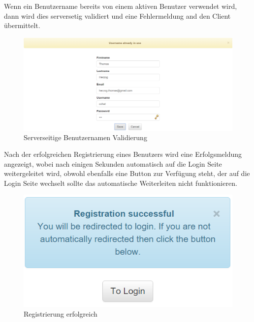 \documentclass[11pt, a4paper, twoside]{article}   	%
\begin{document}
Wenn ein Benutzername bereits von einem aktiven Benutzer verwendet wird, dann wird dies serversetig validiert und eine Fehlermeldung and den Client übermittelt.
\begin{figure}[h]
	\centering
	\includegraphics[scale=0.4]{images/registration_server_validation_username.PNG}
	\caption
	{Serverseitige Benutzernamen Validierung}
\end{figure}
\newpage
Nach der erfolgreichen Registrierung eines Benutzers wird eine Erfolgsmeldung angezeigt, wobei nach einigen Sekunden automatisch auf die Login Seite weitergeleitet wird, obwohl ebenfalls eine Button zur Verfügung steht, der auf die Login Seite wechselt sollte das automatische Weiterleiten nicht funktionieren.
\begin{figure}[h]
	\centering
	\includegraphics[scale=0.6]{images/registration_success.PNG}
	\caption
	{Registrierung erfolgreich}
\end{figure}\\\\
\end{document}

